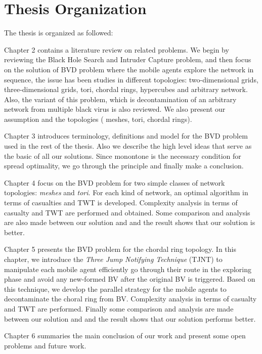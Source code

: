 
\section{Thesis Organization} 

The thesis is organized as followed:

Chapter 2 contains a literature review on related problems. We begin by reviewing the Black Hole Search and Intruder Capture problem, and then focus on the solution of BVD problem where the mobile agents explore the network in sequence, the issue has been studies in different topologies: two-dimensional grids, three-dimensional grids, tori, chordal rings, hypercubes and arbitrary network. Also, the variant of this problem, which is decontamination of an arbitrary network from multiple black virus is also reviewed. We also present our assumption and the topologies ( meshes, tori, chordal rings).

Chapter 3 introduces terminology, definitions and model for the BVD problem used in the rest of the thesis. Also we describe the high level ideas that serve as the basic of all our solutions. Since monontone is the necessary condition for spread optimality, we go through the principle and finally make a conclusion.

Chapter 4 focus on the BVD problem for two simple classes of network topologies: {\em meshes} and {\em tori}. For each kind of network, an optimal algorithm in terms of casualties and TWT is developed. Complexity analysis in terms of casualty and TWT are performed and obtained. Some comparison and analysis are also made between our solution and \cite{Cai} and the result shows that our solution is better.

Chapter 5 presents the BVD problem for the chordal ring topology. In this chapter, we introduce the {\em Three Jump Notifying Technique} (TJNT) to manipulate each mobile agent efficiently go through their route in the exploring phase and avoid any new-formed BV after the original BV is triggered. Based on this technique, we develop the parallel strategy for the mobile agents to decontaminate the choral ring from BV. Complexity analysis in terms of  casualty and TWT are performed. Finally some comparison and analysis are made between our solution and \cite{Alotaibi} and the result shows that our solution performs better.

Chapter 6 summaries the main conclusion of our work and present some open problems and future work.
  



